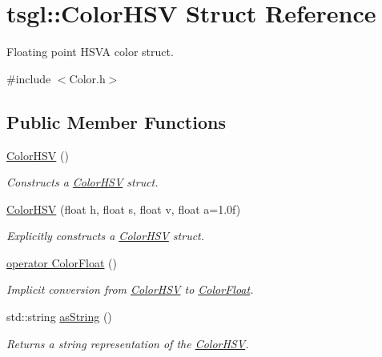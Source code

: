 \hypertarget{structtsgl_1_1_color_h_s_v}{}\section{tsgl\+:\+:Color\+H\+S\+V Struct Reference}
\label{structtsgl_1_1_color_h_s_v}


Floating point H\+S\+V\+A color struct.  




{\ttfamily \#include $<$Color.\+h$>$}

\subsection*{Public Member Functions}
\begin{DoxyCompactItemize}
\item 
\hyperlink{structtsgl_1_1_color_h_s_v_a36b4390ed6aba9f00ac9559ccca74f8a}{Color\+H\+S\+V} ()
\begin{DoxyCompactList}\small\item\em Constructs a \hyperlink{structtsgl_1_1_color_h_s_v}{Color\+H\+S\+V} struct. \end{DoxyCompactList}\item 
\hyperlink{structtsgl_1_1_color_h_s_v_a9ff97b9a0434ab700883b24c3738645d}{Color\+H\+S\+V} (float h, float s, float v, float a=1.\+0f)
\begin{DoxyCompactList}\small\item\em Explicitly constructs a \hyperlink{structtsgl_1_1_color_h_s_v}{Color\+H\+S\+V} struct. \end{DoxyCompactList}\item 
\hyperlink{structtsgl_1_1_color_h_s_v_a85a62f8d581801540717d3b3cd0ae782}{operator Color\+Float} ()
\begin{DoxyCompactList}\small\item\em Implicit conversion from \hyperlink{structtsgl_1_1_color_h_s_v}{Color\+H\+S\+V} to \hyperlink{structtsgl_1_1_color_float}{Color\+Float}. \end{DoxyCompactList}\item 
std\+::string \hyperlink{structtsgl_1_1_color_h_s_v_ab606504c5b0873b1cef707c523fe5eb1}{as\+String} ()
\begin{DoxyCompactList}\small\item\em Returns a string representation of the \hyperlink{structtsgl_1_1_color_h_s_v}{Color\+H\+S\+V}. \end{DoxyCompactList}\end{DoxyCompactItemize}
